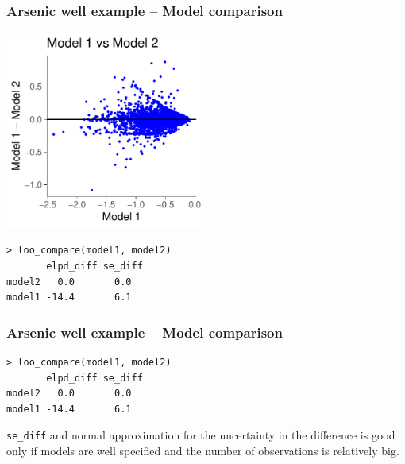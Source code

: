 \documentclass[10pt]{beamer}
\begin{document}
\begin{frame}[fragile]

\frametitle{Arsenic well example -- Model comparison}

  {\includegraphics[width=6.5cm]{figs/arsenicelpddiff.pdf}}
  \\
  {\scriptsize
\begin{lstlisting}
> loo_compare(model1, model2)
       elpd_diff se_diff
model2   0.0       0.0
model1 -14.4       6.1
\end{lstlisting}}

\end{frame}

\begin{frame}[fragile]

\frametitle{Arsenic well example -- Model comparison}

  {\scriptsize
\begin{lstlisting}
> loo_compare(model1, model2)
       elpd_diff se_diff
model2   0.0       0.0
model1 -14.4       6.1
\end{lstlisting}}

    {\tt se\_diff} and normal approximation for the uncertainty in the
    difference is good only if models are well specified and the
    number of observations is relatively big.


\end{frame}
\end{document}
